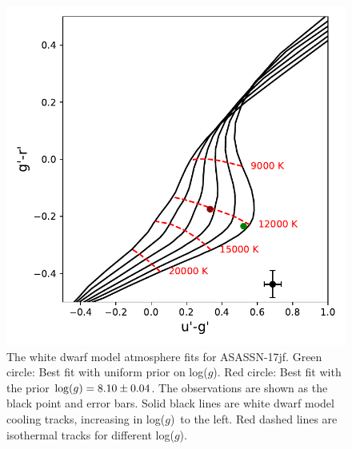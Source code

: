 \begin{figure}
    \centering
    \includegraphics[width=\columnwidth, trim={0 0mm 0 0},clip]{figures/results/three_cvs_with_weird_colours/ASASSN-17jf/PhysicalParams/ASASSN-17jf_colourPlot_alpha_beta.pdf}
    \caption{The white dwarf model atmosphere fits for ASASSN-17jf. Green circle: Best fit with uniform prior on log($g$). Red circle: Best fit with the prior ${\rm log}(g)=8.10\pm0.04$. The observations are shown as the black point and error bars. Solid black lines are white dwarf model cooling tracks, increasing in log($g$)\ to the left. Red dashed lines are isothermal tracks for different log($g$).}
    \label{fig:ASASSN-17jf colours}
\end{figure}
